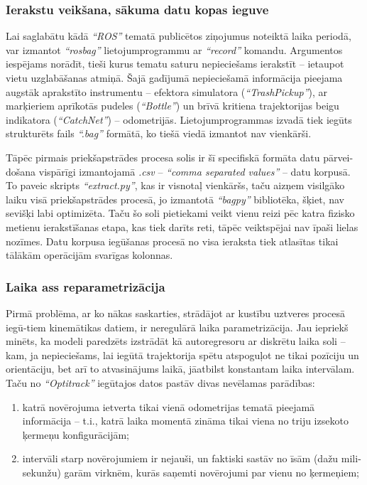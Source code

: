 \documentclass[12pt, a4paper]{article}
\numberwithin{equation}{section} %
\begin{document}
\subsubsection{Ierakstu veikšana, sākuma datu kopas ieguve}

Lai saglabātu kādā \textit{``ROS''} tematā publicētos ziņojumus noteiktā laika periodā, var izmantot \textit{``rosbag''} lietojumprogrammu ar \textit{``record''} komandu. Argumentos iespējams norādīt, tieši kurus tematu saturu nepieciešams ierakstīt -- ietaupot vietu uzglabāšanas atmiņā. Šajā gadījumā nepieciešamā informācija pieejama augstāk aprakstīto instrumentu -- efektora simulatora (\textit{``TrashPickup''}), ar marķieriem aprīkotās pudeles (\textit{``Bottle''}) un brīvā kritiena trajektorijas beigu indikatora (\textit{``CatchNet''}) -- odometrijās.  Lietojumprogrammas izvadā tiek iegūts strukturēts fails \textit{``.bag''} formātā, ko tiešā viedā izmantot nav vienkārši.

Tāpēc pirmais priekšapstrādes procesa solis ir šī specifiskā formāta datu pārvei-došana vispārīgi izmantojamā \textit{.csv} -- \textit{``comma separated values''} -- datu korpusā. To paveic skripts \textit{``extract.py''}, kas ir visnotaļ vienkāršs, taču aizņem visilgāko laiku visā priekšapstrādes procesā, jo izmantotā \textit{``bagpy''} bibliotēka, šķiet, nav sevišķi labi optimizēta. Taču šo soli pietiekami veikt vienu reizi pēc katra fizisko metienu ierakstīšanas etapa, kas tiek darīts reti, tāpēc veiktspējai nav īpaši lielas nozīmes. Datu korpusa iegūšanas procesā no visa ieraksta tiek atlasītas tikai tālākām operācijām svarīgas kolonnas.

\subsubsection{Laika ass reparametrizācija}

Pirmā problēma, ar ko nākas saskarties, strādājot ar kustību uztveres procesā iegū-tiem kinemātikas datiem, ir neregulārā laika parametrizācija. Jau iepriekš minēts, ka modeli paredzēts izstrādāt kā autoregresoru ar diskrētu laika soli -- kam, ja nepieciešams, lai iegūtā trajektorija spētu atspoguļot ne tikai pozīciju un orientāciju, bet arī to atvasinājums laikā, jāatbilst konstantam laika intervālam. Taču no \textit{``Optitrack''} iegūtajos datos pastāv divas nevēlamas parādības:

\begin{enumerate}
    \item katrā novērojuma ietverta tikai vienā odometrijas tematā pieejamā informācija -- t.i., katrā laika momentā zināma tikai viena no triju izsekoto ķermeņu konfigurācijām;
    \item intervāli starp novērojumiem ir nejauši, un faktiski sastāv no īsām (dažu mili-sekunžu) garām virknēm, kurās saņemti novērojumi par vienu no ķermeņiem;
\end{enumerate}
\end{document}
